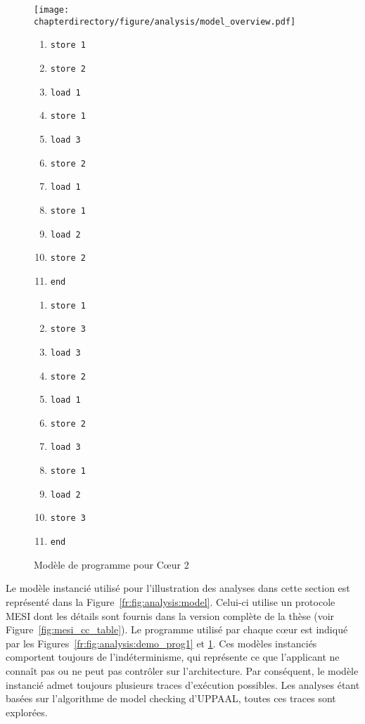\begin{figure}[hbt]
\begin{minipage}[c]{0.55\linewidth}
\texttt{[image: \\chapterdirectory/figure/analysis/model\_overview.pdf]}
\caption{Aperçu de l'exemple de modèle instancié}
\label{fr:fig:analysis:model}
\end{minipage}
\begin{minipage}[t]{0.2\linewidth}
\begin{enumerate}
  \setlength{\itemsep}{0pt}%
   \setlength{\parskip}{0pt}%
\item \texttt{store 1}
\item \texttt{store 2}
\item \texttt{load 1}
\item \texttt{store 1}
\item \texttt{load 3}
\item \texttt{store 2}
\item \texttt{load 1}
\item \texttt{store 1}
\item \texttt{load 2}
\item \texttt{store 2}
\item \texttt{end}
\end{enumerate}
\caption{Modèle de programme pour Cœur 1}
\label{fr:fig:analysis:demo_prog1}
\end{minipage}
\begin{minipage}[t]{0.2\linewidth}
\begin{enumerate}
  \setlength{\itemsep}{0pt}%
   \setlength{\parskip}{0pt}%
\item \texttt{store 1}
\item \texttt{store 3}
\item \texttt{load 3}
\item \texttt{store 2}
\item \texttt{load 1}
\item \texttt{store 2}
\item \texttt{load 3}
\item \texttt{store 1}
\item \texttt{load 2}
\item \texttt{store 3}
\item \texttt{end}
\end{enumerate}
\caption{Modèle de programme pour Cœur 2}
\label{fr:fig:analysis:demo_prog2}
\end{minipage}
\end{figure}

Le modèle instancié utilisé pour l'illustration des analyses dans cette section
est représenté dans la Figure~\ref{fr:fig:analysis:model}. Celui-ci utilise un
protocole MESI dont les détails sont fournis dans la version complète de la
thèse (voir Figure~\ref{fig:mesi_cc_table}). Le programme
utilisé par chaque cœur est indiqué par les
Figures~\ref{fr:fig:analysis:demo_prog1} et \ref{fr:fig:analysis:demo_prog2}.
Ces modèles instanciés comportent toujours de l'indéterminisme, qui
représente ce que l'applicant ne connaît pas ou ne peut pas contrôler
sur l'architecture.  Par conséquent, le modèle instancié admet
toujours plusieurs traces d'exécution possibles. Les analyses étant
basées sur l'algorithme de model checking d'UPPAAL, toutes ces traces
sont explorées.


